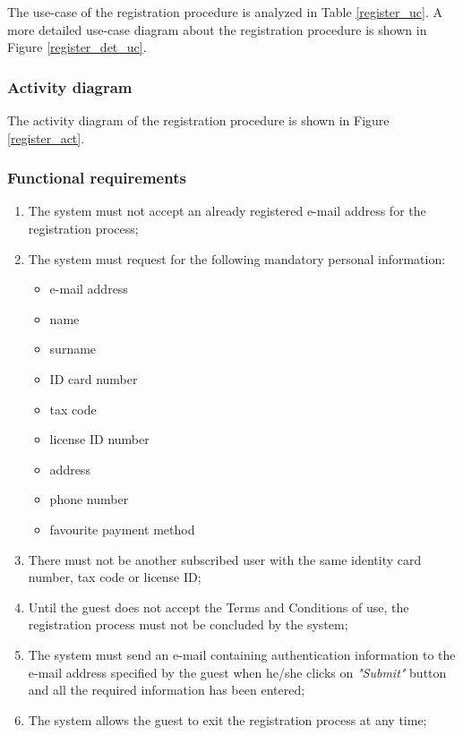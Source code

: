 The use-case of the registration procedure is analyzed in Table \ref{register_uc}.
A more detailed use-case diagram about the registration procedure is shown in Figure \ref{register_det_uc}.

\subsubsection{Activity diagram}

The activity diagram of the registration procedure is shown in Figure \ref{register_act}.

\subsubsection{Functional requirements}
\begin{enumerate}
\item The system must not accept an already registered e-mail address for the registration process;
\item The system must request for the following mandatory personal information:
	\begin{itemize}
	\item e-mail address
	\item name
	\item surname
	\item ID card number
	\item tax code
	\item license ID number
	\item address
	\item phone number
	\item favourite payment method
	\end{itemize}
\item There must not be another subscribed user with the same identity card number, tax code or license ID;
\item Until the guest does not accept the Terms and Conditions of use, the registration process must not be concluded by the system;
\item The system must send an e-mail containing authentication information to the e-mail address specified by the guest when he/she clicks on \emph{"Submit"} button and all the required information has been entered;
\item The system allows the guest to exit the registration process at any time;
\end{enumerate}

